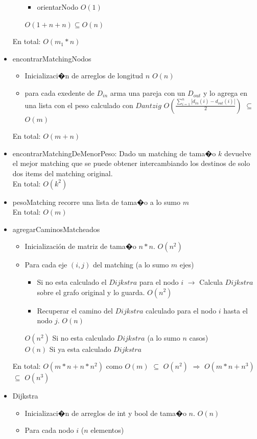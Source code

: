 \documentclass[11pt, a4paper, spanish]{article}
\begin{document}
\begin{itemize}
\begin{itemize}
\begin{itemize}
			\item orientarNodo $O(1)$
		\end{itemize}
		$O(1+ n+ n) \subseteq O(n)$
	\end{itemize}
	En total: $O(m_{1} * n)$
\newpage
	\item encontrarMatchingNodos
	\begin{itemize}
		\item Inicializaci�n de arreglos de longitud $n$ $O(n)$
		\item para cada exedente de $D_{in}$ arma una pareja con un $D_{out}$ y lo agrega en una lista con el peso calculado con $Dantzig$ $O(\frac{\sum_{i=1}^{n}{|d_{in}(i)-d_{out}(i)|}}{2})$ $\subseteq$ $O(m)$
	\end{itemize}
	En total: $O(m + n)$
	\item encontrarMatchingDeMenorPeso: Dado un matching de tama�o $k$ devuelve el mejor matching que se puede obtener intercambiando los destinos de solo dos items del matching original. \\En total: $O(k^{2})$
	\item pesoMatching recorre una lista de tama�o a lo sumo $m$\\
	En total: $O(m)$
	\item agregarCaminosMatcheados
	\begin{itemize}
		\item Inicializaci\'on de matriz de tama�o $n*n$. $O(n^{2})$
		\item Para cada eje $(i,j)$ del matching (a lo sumo $m$ ejes)
		\begin{itemize}
			\item Si no esta calculado el $Dijkstra$ para el nodo $i$ $\rightarrow$ Calcula $Dijkstra$ sobre el grafo original y lo guarda. $O(n^{2})$
			\item Recuperar el camino del $Dijkstra$ calculado para el nodo $i$ hasta el nodo $j$. $O(n)$
		\end{itemize}
		$O(n^{2})$ Si no esta calculado $Dijkstra$ (a lo sumo $n$ casos)\\
		$O(n)$ Si ya esta calculado $Dijkstra$
	\end{itemize}
	En total: $O(m*n + n*n^{2})$ como $O(m)$ $\subseteq$ $O(n^{2})$ $\Rightarrow$ $O(m*n + n^{3})$ $\subseteq$ $O(n^{3})$
	\item Dijkstra
	\begin{itemize}
		\item Inicializaci�n de arreglos de int y bool de tama�o $n$. $O(n)$
		\item Para cada nodo $i$ ($n$ elementos)

\end{itemize}
\end{itemize}
\end{document}
